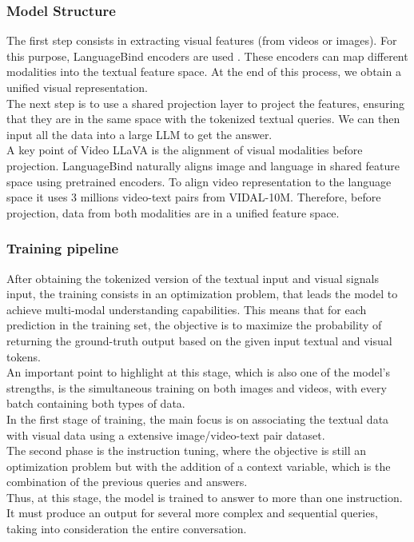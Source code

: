 \documentclass[10pt,twocolumn,letterpaper]{article}
\begin{document}
\subsubsection{Model Structure}
The first step consists in extracting visual features (from videos or images). For this purpose, LanguageBind encoders are used \cite{b9}. These encoders can map different modalities into the textual feature space. At the end of this process, we obtain a unified visual representation.\\ 
The next step is to use a shared projection layer to project the features, ensuring that they are in the same space with the tokenized textual queries. We can then input all the data into a large LLM to get the answer.\\
A key point of Video LLaVA is the alignment of visual modalities before projection. LanguageBind naturally aligns image and language in shared feature space using pretrained encoders. To align video representation to the language space it uses 3 millions video-text pairs from VIDAL-10M\cite{b9}. Therefore, before projection, data from both modalities are in a unified feature space.

\subsubsection{Training pipeline}
After obtaining the tokenized version of the textual input and visual signals input, the training consists in an optimization problem, that leads the model to achieve multi-modal understanding capabilities.
This means that for each prediction in the training set, the objective is to maximize the probability of returning the ground-truth output based on the given input textual and visual tokens. \\
An important point to highlight at this stage, which is also one of the model's strengths, is the simultaneous training on both images and videos, with every batch containing both types of data.\\
In the first stage of training, the main focus is on associating the textual data with visual data using a extensive image/video-text pair dataset.\\
The second phase is the instruction tuning, where the objective is still an optimization problem but with the addition of a context variable, which is the combination of the previous queries and answers.\\
Thus, at this stage, the model is trained to answer to more than one instruction. It must produce an output for several more complex and sequential queries, taking into consideration the entire conversation.
\end{document}
